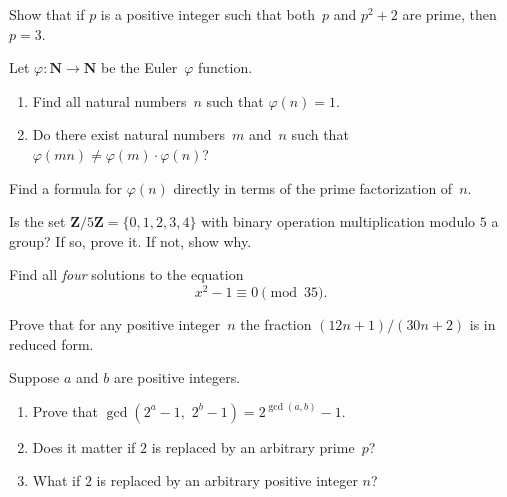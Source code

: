 \documentclass{exam}
\newcommand{\Z}{\mathbb Z}
\newcommand{\defn}[1]{{\em #1}\index{#1|nn}}
\newcommand{\N}{\mathbb{N}}
\newcommand{\con}{\equiv}
\newcommand{\ra}{\rightarrow}
\newcommand{\vphi}{\varphi}
\renewcommand{\mathbb}{\mathbf}
\begin{document}
\begin{questions}
\item\label{ex:pcube} Show that if $p$ is a positive integer such that both~$p$
and $p^2+2$ are prime, then $p=3$.


\question[5]\label{ex:phimult} Let $\vphi:\N\ra\N$ be the
Euler~$\vphi$ function.
\begin{enumerate}
   \item Find all natural numbers~$n$ such that $\vphi(n)=1$.
   \item Do there exist natural numbers~$m$ and~$n$ such that
     $\vphi(mn)\neq \vphi(m)\cdot \vphi(n)$?
      \end{enumerate}

\question[5]\label{ex:phiformula} Find a formula for $\vphi(n)$ directly in terms
of the prime factorization of~$n$.


\question[5] Is the set $\Z/5\Z=\{0,1,2,3,4\}$ with binary operation
multiplication modulo $5$ a group? If so, prove it. If not, show why.

\question[10]\label{ex:solnsqrtmod35} Find all {\em four} solutions to the equation
$$
  x^2 - 1\con 0 \pmod{35}.
$$

\question[10]\label{ex:reducedfraction}
Prove that for any positive integer~$n$ the fraction
  $(12n+1)/(30n+2)$ is in reduced form.


\question[10]\label{ex:gcd2} Suppose $a$ and $b$ are positive integers.
\begin{enumerate}
\item Prove that
$\gcd(2^a-1,\,\, 2^b-1) = 2^{\gcd(a,b)}-1.$
\item Does it matter if $2$ is replaced by an arbitrary prime~$p$?
\item What if $2$ is replaced by an arbitrary positive integer $n$?
\end{enumerate}


\end{questions}
\end{document}
